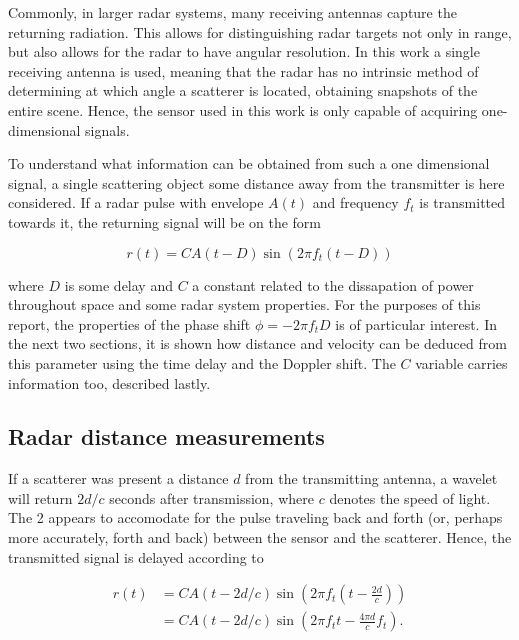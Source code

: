 Commonly, in larger radar systems, many receiving antennas capture the returning radiation. This allows for distinguishing radar targets not only in range, but also allows for the radar to have angular resolution. In this work a single receiving antenna is used, meaning that the radar has no intrinsic method of determining at which angle a scatterer is located, obtaining snapshots of the entire scene. Hence, the sensor used in this work is only capable of acquiring one-dimensional signals. 

To understand what information can be obtained from such a one dimensional signal, a single scattering object some distance away from the transmitter is here considered. If a radar pulse with envelope $A(t)$ and frequency $f_t$ is transmitted towards it, the returning signal will be on the form \citep{richards_2014}

\begin{equation}\label{eq:returning}
	r(t) = CA(t-D)\sin(2\pi f_t (t-D))
\end{equation}

where $D$ is some delay and $C$ a constant related to the dissapation of power throughout space and some radar system properties. For the purposes of this report, the properties of the phase shift $\phi=-2\pi f_tD$ is of particular interest. In the next two sections, it is shown how distance and velocity can be deduced from this parameter using the time delay and the Doppler shift. The $C$ variable carries information too, described lastly. 

\subsection{Radar distance measurements}

If a scatterer was present a distance $d$ from the transmitting antenna, a wavelet will return $2d/c$ seconds after transmission, where $c$ denotes the speed of light. The 2 appears to accomodate for the pulse traveling back and forth (or, perhaps more accurately, forth and back) between the sensor and the scatterer. Hence, the transmitted signal is delayed according to 

\begin{equation}
	\begin{split}
		r(t) 
		& = CA(t-2d/c)\sin(2\pi f_t(t - \frac{2d}{c})) \\
		& = CA(t-2d/c)\sin(2\pi f_tt - \frac{4\pi d}{c}f_t).
	\end{split}
\end{equation}

